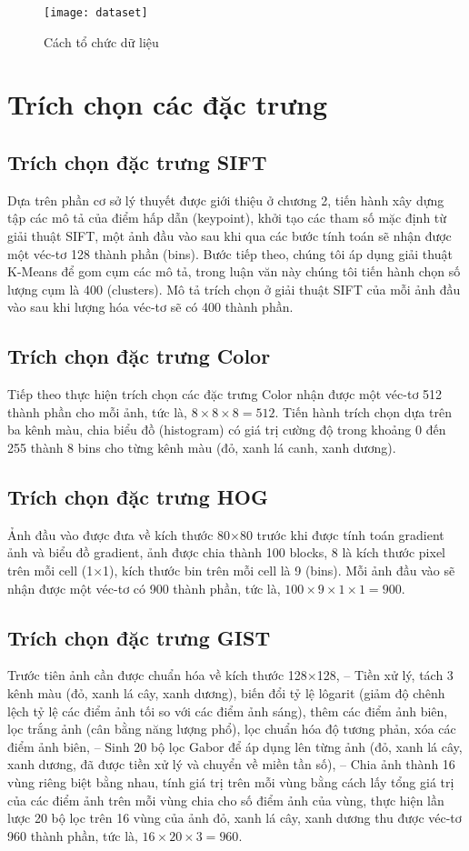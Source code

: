 \begin{figure}[h]
	\centering
	\texttt{[image: dataset]}
	\caption{Cách tổ chức dữ liệu}
	\label{fig:dataset}
\end{figure}

\section{Trích chọn các đặc trưng}\label{sec:xay-dung-ma-tran}
\subsection{Trích chọn đặc trưng SIFT}
Dựa trên phần cơ sở lý thuyết được giới thiệu ở chương 2, tiến hành xây dựng tập các mô tả của điểm hấp dẫn (keypoint), khởi tạo các tham số mặc định từ giải thuật SIFT, một ảnh đầu vào sau khi qua các bước tính toán sẽ nhận được một véc-tơ 128 thành phần (bins). Bước tiếp theo, chúng tôi áp dụng giải thuật K-Means để gom cụm các mô tả, trong luận văn này chúng tôi tiến hành chọn số lượng cụm là 400 (clusters).  Mô tả trích chọn ở giải thuật SIFT của mỗi ảnh đầu vào sau khi lượng hóa véc-tơ sẽ có 400 thành phần.

\subsection{Trích chọn đặc trưng Color}
Tiếp theo thực hiện trích chọn các đặc trưng Color nhận được một véc-tơ 512 thành phần cho mỗi ảnh, tức là, $8 \times 8 \times 8 = 512$. Tiến hành trích chọn dựa trên ba kênh màu, chia biểu đồ (histogram) có giá trị cường độ trong khoảng 0 đến 255 thành 8 bins cho từng kênh màu (đỏ, xanh lá canh, xanh dương).

\subsection{Trích chọn đặc trưng HOG}
Ảnh đầu vào được đưa về kích thước 80$\times$80 trước khi được tính toán gradient ảnh và biểu đồ gradient, ảnh được chia thành 100 blocks, 8 là kích thước pixel trên mỗi cell (1$\times$1), kích thước bin trên mỗi cell là 9 (bins). Mỗi ảnh đầu vào sẽ nhận được một véc-tơ có 900 thành phần, tức là, $100 \times 9 \times 1 \times 1= 900$.

\subsection{Trích chọn đặc trưng GIST}
Trước tiên ảnh cần được chuẩn hóa về kích thước 128$\times$128, -- Tiền xử lý, tách 3 kênh màu (đỏ, xanh lá cây, xanh dương), biến đổi tỷ lệ lôgarit (giảm độ chênh lệch tỷ lệ các điểm ảnh tối so với các điểm ảnh sáng), thêm các điểm ảnh biên, lọc trắng ảnh (cân bằng năng lượng phổ), lọc chuẩn hóa độ tương phản, xóa các điểm ảnh biên, -- Sinh 20 bộ lọc Gabor để áp dụng lên từng ảnh (đỏ, xanh lá cây, xanh dương, đã được tiền xử lý và chuyển về miền tần số), -- Chia ảnh thành 16 vùng riêng biệt bằng nhau, tính giá trị trên mỗi vùng bằng cách lấy tổng giá trị của các điểm ảnh trên mỗi vùng chia cho số điểm ảnh của vùng, thực hiện lần lược 20 bộ lọc trên 16 vùng của ảnh đỏ, xanh lá cây, xanh dương thu được véc-tơ 960 thành phần, tức là, $16 \times 20 \times 3 = 960$.

